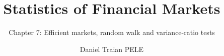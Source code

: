 \title[Statistics of Financial Markets]{Statistics of Financial Markets}
\subtitle{Chapter 7: Efficient markets, random walk and variance-ratio tests}
\author[D.T. Pele]{Daniel Traian PELE}
\date{}

\providecommand{\sfmapplink}[3]{\hypertarget{#2}{}\hyperlink{#1}{\beamergotobutton{#3}}}  %
\providecommand{\sfmappback}[2]{\begin{tikzpicture}[remember picture,overlay]\node[anchor=south east] at ([xshift=-3mm,yshift=7mm]current page.south east){\hyperlink{#1}{\beamerreturnbutton{#2}}};\end{tikzpicture}}  %
\providecommand{\sfmchlink}[2]{\href{#1}{#2}}  %
\providecommand{\sfmchlinkt}[2]{\href{#1}{\usebeamercolor[fg]{frametitle}#2}}  %


